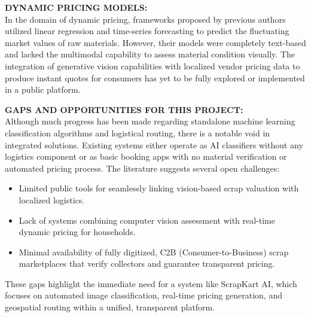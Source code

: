 \textbf{DYNAMIC PRICING MODELS:}\\
In the domain of dynamic pricing, frameworks proposed by previous authors utilized linear regression and time-series forecasting to predict the fluctuating market values of raw materials. However, their models were completely text-based and lacked the multimodal capability to assess material condition visually. The integration of generative vision capabilities with localized vendor pricing data to produce instant quotes for consumers has yet to be fully explored or implemented in a public platform.

\textbf{GAPS AND OPPORTUNITIES FOR THIS PROJECT:}\\
Although much progress has been made regarding standalone machine learning classification algorithms and logistical routing, there is a notable void in integrated solutions. Existing systems either operate as AI classifiers without any logistics component or as basic booking apps with no material verification or automated pricing process. The literature suggests several open challenges:
\begin{itemize}
    \item Limited public tools for seamlessly linking vision-based scrap valuation with localized logistics.
    \item Lack of systems combining computer vision assessment with real-time dynamic pricing for households.
    \item Minimal availability of fully digitized, C2B (Consumer-to-Business) scrap marketplaces that verify collectors and guarantee transparent pricing.
\end{itemize}
These gaps highlight the immediate need for a system like ScrapKart AI, which focuses on automated image classification, real-time pricing generation, and geospatial routing within a unified, transparent platform.
